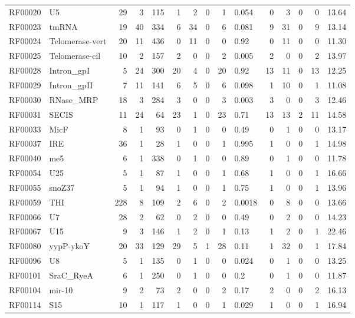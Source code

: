 \documentclass[11pt]{article}
\begin{document}
\begin{table}
\begin{center}
\begin{tabular}{|ll|rrr|rrrrl|rrrrr|}
RF00020 & U5 & 29 & 3 & 115 & 1 & 2 & 0 & 1 &  0.054 & 0 & 3 & 0 & 0 &  13.64 \\  
RF00023 & tmRNA & 19 & 40 & 334 & 6 & 34 & 0 & 6 &  0.081 & 9 & 31 & 0 & 9 &  13.14 \\  
RF00024 & Telomerase-vert & 20 & 11 & 436 & 0 & 11 & 0 & 0 &   0.92 & 0 & 11 & 0 & 0 &   11.30 \\  
RF00025 & Telomerase-cil & 10 & 2 & 157 & 2 & 0 & 0 & 2 &  0.005 & 2 & 0 & 0 & 2 &  13.97 \\  
RF00028 & Intron\_gpI & 5 & 24 & 300 & 20 & 4 & 0 & 20 &   0.92 & 13 & 11 & 0 & 13 &  12.25 \\  
RF00029 & Intron\_gpII & 7 & 11 & 141 & 6 & 5 & 0 & 6 &  0.098 & 1 & 10 & 0 & 1 &  11.08 \\  
RF00030 & RNase\_MRP & 18 & 3 & 284 & 3 & 0 & 0 & 3 &  0.003 & 3 & 0 & 0 & 3 &  12.46 \\  
RF00031 & SECIS & 11 & 24 & 64 & 23 & 1 & 0 & 23 &  0.71 & 13 & 13 & 2 & 11 &  14.58 \\  
RF00033 & MicF & 8 & 1 & 93 & 0 & 1 & 0 & 0 &   0.49 & 0 & 1 & 0 & 0 &  13.17 \\  
RF00037 & IRE & 36 & 1 & 28 & 1 & 0 & 0 & 1 &  0.995 & 1 & 0 & 0 & 1 &  14.98 \\  
RF00040 & me5 & 6 & 1 & 338 & 0 & 1 & 0 & 0 &   0.89 & 0 & 1 & 0 & 0 &  11.78 \\  
RF00054 & U25 & 5 & 1 & 87 & 1 & 0 & 0 & 1 &   0.68 & 1 & 0 & 0 & 1 &  16.66 \\  
RF00055 & snoZ37 & 5 & 1 & 94 & 1 & 0 & 0 & 1 &   0.75 & 1 & 0 & 0 & 1 &  13.96 \\  
RF00059 & THI & 228 & 8 & 109 & 2 & 6 & 0 & 2 & 0.0018 & 0 & 8 & 0 & 0 &  13.66 \\  
RF00066 & U7 & 28 & 2 & 62 & 0 & 2 & 0 & 0 &   0.49 & 0 & 2 & 0 & 0 &  14.23 \\  
RF00067 & U15 & 9 & 3 & 146 & 1 & 2 & 0 & 1 &   0.13 & 1 & 2 & 0 & 1 &  22.46 \\  
RF00080 & yypP-ykoY & 20 & 33 & 129 & 29 & 5 & 1 & 28 &   0.11 & 1 & 32 & 0 & 1 &  17.84 \\  
RF00096 & U8 & 5 & 1 & 135 & 0 & 1 & 0 & 0 &  0.024 & 0 & 1 & 0 & 0 &  13.25 \\  
RF00101 & SraC\_RyeA & 6 & 1 & 250 & 0 & 1 & 0 & 0 &    0.2 & 0 & 1 & 0 & 0 &  11.87 \\  
RF00104 & mir-10 & 9 & 2 & 73 & 2 & 0 & 0 & 2 &   0.17 & 2 & 0 & 0 & 2 &  16.13 \\  
RF00114 & S15 & 10 & 1 & 117 & 1 & 0 & 0 & 1 &  0.029 & 1 & 0 & 0 & 1 &  16.94 \\  

\end{tabular}
\end{center}
\end{table}
\end{document}
